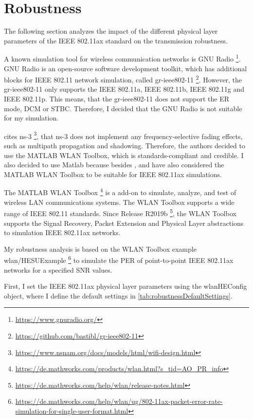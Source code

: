 \section{Robustness}
\label{sec:Robustness}
The following section analyzes the impact of the different physical layer parameters of the IEEE 802.11ax standard on the transmission robustness.

A known simulation tool for wireless communication networks is GNU Radio \footnote{\url{https://www.gnuradio.org/}}.
GNU Radio is an open-source software development toolkit, which has additional blocks for IEEE 802.11 network simulation,
called gr-ieee802-11 \footnote{\url{https://github.com/bastibl/gr-ieee802-11}}.
However, the gr-ieee802-11 only supports the IEEE 802.11a, IEEE 802.11b, IEEE 802.11g and IEEE 802.11p.
This means, that the gr-ieee802-11 does not support the \ac{ER} mode, \ac{DCM} or \ac{STBC}.
Therefore, I decided that the GNU Radio is not suitable for my simulation.

\textcite{s_performance_2022} cites ns-3 \footnote{\url{https://www.nsnam.org/docs/models/html/wifi-design.html}},
that ns-3 does not implement
any frequency-selective fading effects, such as multipath propagation and shadowing.
Therefore, the authors decided to use the MATLAB WLAN Toolbox, which is standards-compliant and credible.
I also decided to use Matlab because besides \cite{s_performance_2022}, \cite{cao_efficient_2022} and
\cite{jin_efficient_2021} have also considered
the MATLAB WLAN Toolbox to be suitable for IEEE 802.11ax simulations.

The MATLAB WLAN Toolbox \footnote{\url{https://de.mathworks.com/products/wlan.html?s_tid=AO_PR_info}} is a add-on to simulate, analyze, and test of wireless LAN communications systems.
The WLAN Toolbox supports a wide range of IEEE 802.11 standards.
Since Release R2019b \footnote{\url{https://de.mathworks.com/help/wlan/release-notes.html}}, the WLAN Toolbox supports the Signal Recovery, Packet Extension and Physical Layer abstractions to simulation IEEE 802.11ax networks.

My robustness analysis is based on the WLAN Toolbox example wlan/HESUExample \footnote{\url{https://de.mathworks.com/help/wlan/ug/802-11ax-packet-error-rate-simulation-for-single-user-format.html}} to simulate the \ac{PER} of point-to-point IEEE 802.11ax networks for
a specified \ac{SNR} values.

First, I set the IEEE 802.11ax physical layer parameters using the wlanHEConfig object,
where I define the default settings in \autoref{tab:robustnessDefaultSettings}.

